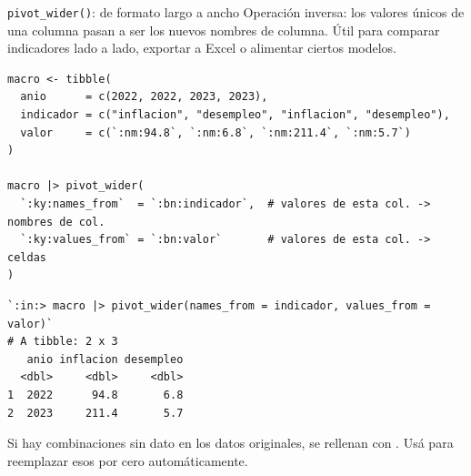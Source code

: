 \documentclass[8pt]{beamer}
\begin{document}
	\begin{frame}[fragile]{\texttt{pivot\_wider()}: de formato largo a ancho}
		Operación inversa: los valores únicos de una columna pasan a ser los nuevos nombres de columna. Útil para comparar indicadores lado a lado, exportar a Excel o alimentar ciertos modelos.

\begin{lstlisting}[style=RScript]
macro <- tibble(
  anio      = c(2022, 2022, 2023, 2023),
  indicador = c("inflacion", "desempleo", "inflacion", "desempleo"),
  valor     = c(`:nm:94.8`, `:nm:6.8`, `:nm:211.4`, `:nm:5.7`)
)

macro |> pivot_wider(
  `:ky:names_from`  = `:bn:indicador`,  # valores de esta col. -> nombres de col.
  `:ky:values_from` = `:bn:valor`       # valores de esta col. -> celdas
)
\end{lstlisting}
\begin{lstlisting}[style=RConsole]
`:in:> macro |> pivot_wider(names_from = indicador, values_from = valor)`
# A tibble: 2 x 3
   anio inflacion desempleo
  <dbl>     <dbl>     <dbl>
1  2022      94.8       6.8
2  2023     211.4       5.7
\end{lstlisting}

		\begin{block}{}
			Si hay combinaciones sin dato en los datos originales, se rellenan con . Usá  para reemplazar esos  por cero automáticamente.
		\end{block}
	\end{frame}
\end{document}

